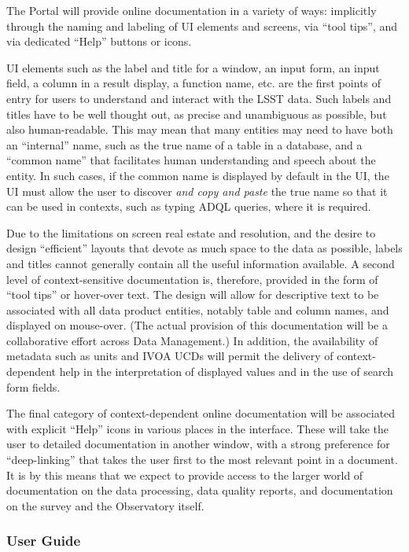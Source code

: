 The Portal will provide online documentation in a variety of ways: implicitly through the naming and labeling of UI elements and screens, via ``tool tips'', and via dedicated ``Help'' buttons or icons.

UI elements such as the label and title for a window, an input form, an input field, a column in a result display, a function name, etc. are the first points of entry for users to understand and interact with the LSST data. 
Such labels and titles have to be well thought out, as precise and unambiguous as possible, but also human-readable.
This may mean that many entities may need to have both an ``internal'' name, such as the true name of a table in a database, and a ``common name'' that facilitates human understanding and speech about the entity.
In such cases, if the common name is displayed by default in the UI, the UI must allow the user to discover \emph{and copy and paste} the true name so that it can be used in contexts, such as typing ADQL queries, where it is required.

Due to the limitations on screen real estate and resolution, and the desire to design ``efficient'' layouts that devote as much space to the data as possible, labels and titles cannot generally contain all the useful information available.
A second level of context-sensitive documentation is, therefore, provided in the form of ``tool tips'' or hover-over text.
The design will allow for descriptive text to be associated with all data product entities, notably table and column names, and displayed on mouse-over.
(The actual provision of this documentation will be a collaborative effort across Data Management.)
In addition, the availability of metadata such as units and IVOA UCDs will permit the delivery of context-dependent help in the interpretation of displayed values and in the use of search form fields.

The final category of context-dependent online documentation will be associated with explicit ``Help'' icons in various places in the interface.
These will take the user to detailed documentation in another window, with a strong preference for ``deep-linking'' that takes the user first to the most relevant point in a document.
It is by this means that we expect to provide access to the larger world of documentation on the data processing, data quality reports, and documentation on the survey and the Observatory itself. 

\subsubsection{User Guide}\label{user-guide}

